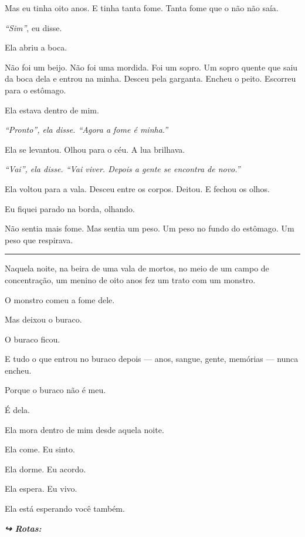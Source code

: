 \noindent Mas eu tinha oito anos.
E tinha tanta fome.
Tanta fome que o não não saía.

\noindent \textit{\textquotedblleft{}Sim\textquotedblright{}}, eu disse.

\noindent Ela abriu a boca.

\noindent Não foi um beijo. Não foi uma mordida. Foi um sopro. Um sopro quente que saiu da boca dela e entrou na minha. Desceu pela garganta. Encheu o peito. Escorreu para o estômago.

\noindent Ela estava dentro de mim.

\noindent \textit{\textquotedblleft{}Pronto\textquotedblright{}\textit{, ela disse. }\textquotedblleft{}Agora a fome é minha.\textquotedblright{}}

\noindent Ela se levantou. Olhou para o céu. A lua brilhava.

\noindent \textit{\textquotedblleft{}Vai\textquotedblright{}\textit{, ela disse. } \textquotedblleft{}Vai viver. Depois a gente se encontra de novo.\textquotedblright{}}

\noindent Ela voltou para a vala. Desceu entre os corpos. Deitou. E fechou os olhos.

\noindent Eu fiquei parado na borda, olhando.

\noindent Não sentia mais fome.
Mas sentia um peso.
Um peso no fundo do estômago.
Um peso que respirava.

\vspace{0.5em}\noindent\rule{\textwidth}{0.5pt}\vspace{0.5em}

\noindent Naquela noite, na beira de uma vala de mortos, no meio de um campo de concentração, um menino de oito anos fez um trato com um monstro.

\noindent O monstro comeu a fome dele.

\noindent Mas deixou o buraco.

\noindent O buraco ficou.

\noindent E tudo o que entrou no buraco depois --- anos, sangue, gente, memórias --- nunca encheu.

\noindent Porque o buraco não é meu.

\noindent É dela.

\noindent Ela mora dentro de mim desde aquela noite.

\noindent Ela come. Eu sinto.

\noindent Ela dorme. Eu acordo.

\noindent Ela espera. Eu vivo.

\noindent Ela está esperando você também.

\vspace{0.5em}
\noindent\textit{\textbf{↪ Rotas:}  \rotasep {} \rotasep {}}